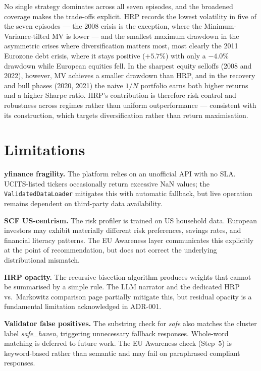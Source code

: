 \documentclass[11pt, a4paper]{article}
\begin{document}
No single strategy dominates across all seven episodes, and the broadened coverage makes the trade-offs explicit. HRP records the lowest volatility in five of the seven episodes — the 2008 crisis is the exception, where the Minimum-Variance-tilted MV is lower — and the smallest maximum drawdown in the asymmetric crises where diversification matters most, most clearly the 2011 Eurozone debt crisis, where it stays positive ($+5.7\%$) with only a $-4.0\%$ drawdown while European equities fell. In the sharpest equity selloffs (2008 and 2022), however, MV achieves a smaller drawdown than HRP, and in the recovery and bull phases (2020, 2021) the naive $1/N$ portfolio earns both higher returns and a higher Sharpe ratio. HRP's contribution is therefore risk control and robustness across regimes rather than uniform outperformance — consistent with its construction, which targets diversification rather than return maximisation.

\section{Limitations}

\textbf{yfinance fragility.} The platform relies on an unofficial API with no SLA. UCITS-listed tickers occasionally return excessive NaN values; the \texttt{ValidatedDataLoader} mitigates this with automatic fallback, but live operation remains dependent on third-party data availability.

\textbf{SCF US-centrism.} The risk profiler is trained on US household data. European investors may exhibit materially different risk preferences, savings rates, and financial literacy patterns. The EU Awareness layer communicates this explicitly at the point of recommendation, but does not correct the underlying distributional mismatch.

\textbf{HRP opacity.} The recursive bisection algorithm produces weights that cannot be summarised by a simple rule. The LLM narrator and the dedicated HRP vs.\ Markowitz comparison page partially mitigate this, but residual opacity is a fundamental limitation acknowledged in ADR-001.

\textbf{Validator false positives.} The substring check for \textit{safe} also matches the cluster label \textit{safe\_haven}, triggering unnecessary fallback responses. Whole-word matching is deferred to future work. The EU Awareness check (Step~5) is keyword-based rather than semantic and may fail on paraphrased compliant responses.
\end{document}
